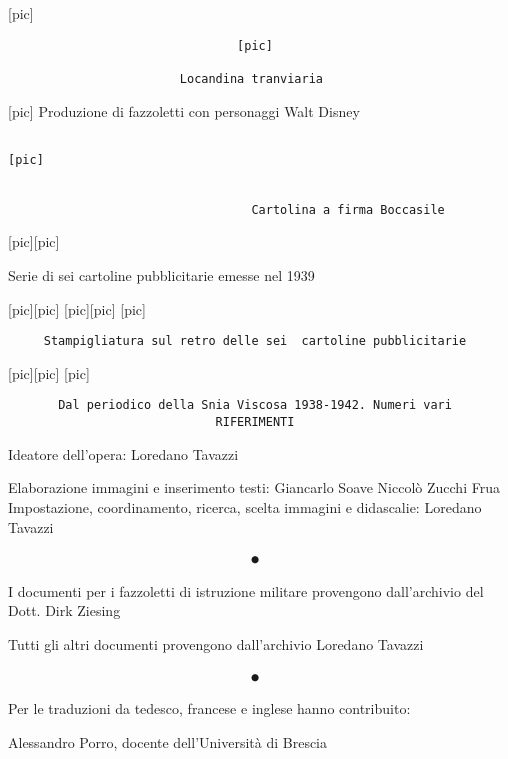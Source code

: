 {[}pic{]}

\begin{verbatim}
                                [pic]

                        Locandina tranviaria
\end{verbatim}

{[}pic{]} Produzione di fazzoletti con personaggi Walt Disney

\begin{verbatim}
                                                                   [pic]


                                  Cartolina a firma Boccasile
\end{verbatim}

{[}pic{]}{[}pic{]}

Serie di sei cartoline pubblicitarie emesse nel 1939

{[}pic{]}{[}pic{]} {[}pic{]}{[}pic{]} {[}pic{]}

\begin{verbatim}
     Stampigliatura sul retro delle sei  cartoline pubblicitarie
\end{verbatim}

{[}pic{]}{[}pic{]} {[}pic{]}

\begin{verbatim}
       Dal periodico della Snia Viscosa 1938-1942. Numeri vari
                             RIFERIMENTI
\end{verbatim}

Ideatore dell'opera: Loredano Tavazzi

Elaborazione immagini e inserimento testi: Giancarlo Soave Niccolò
Zucchi Frua Impostazione, coordinamento, ricerca, scelta immagini e
didascalie: Loredano Tavazzi

\begin{verbatim}
                                  ●
\end{verbatim}

I documenti per i fazzoletti di istruzione militare provengono
dall'archivio del Dott. Dirk Ziesing

Tutti gli altri documenti provengono dall'archivio Loredano Tavazzi

\begin{verbatim}
                                  ●
\end{verbatim}

Per le traduzioni da tedesco, francese e inglese hanno contribuito:

Alessandro Porro, docente dell'Università di Brescia

